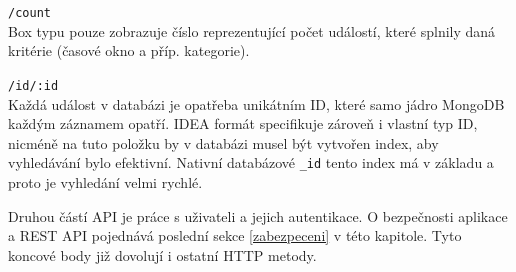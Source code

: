 \begin{description}
    \item \texttt{/count}\\
        Box typu  pouze zobrazuje číslo reprezentující počet událostí, které splnily daná kritérie (časové okno a příp. kategorie).
    
    \item \texttt{/id/:id}\\
        Každá událost v databázi je opatřeba unikátním ID, které samo jádro MongoDB každým záznamem opatří. IDEA formát specifikuje zároveň i vlastní typ ID, nicméně na tuto položku by v databázi musel být vytvořen index, aby vyhledávání bylo efektivní. Nativní databázové \texttt{\_id} tento index má v základu a proto je vyhledání velmi rychlé.

\end{description}

Druhou částí API je práce s uživateli a jejich autentikace. O bezpečnosti aplikace a REST API pojednává poslední sekce \ref{zabezpeceni} v této kapitole. Tyto koncové body již dovolují i ostatní HTTP metody.

